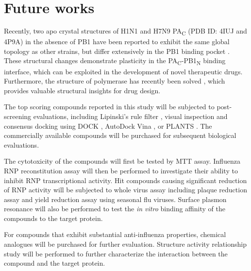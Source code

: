 \section{Future works}

Recently, two apo crystal structures of H1N1 and H7N9 PA\textsubscript{C} (PDB ID: 4IUJ and 4P9A) in the absence of PB1 have been reported to exhibit the same global topology as other strains, but differ extensively in the PB1 binding pocket \citep{1585}. These structural changes demonstrate plasticity in the PA\textsubscript{C}-PB1\textsubscript{N} binding interface, which can be exploited in the development of novel therapeutic drugs. Furthermore, the structure of polymerase has recently been solved \citep{1618,1620}, which provides valuable structural insights for drug design.

The top scoring compounds reported in this study will be subjected to post-screening evaluations, including Lipinski's rule filter \citep{169}, visual inspection and consensus docking \citep{1590} using DOCK \citep{1222}, AutoDock Vina \citep{595}, or PLANTS \citep{610,607,779}. The commercially available compounds will be purchased for subsequent biological evaluations.

The cytotoxicity of the compounds will first be tested by MTT assay. Influenza RNP reconstitution assay will then be performed to investigate their ability to inhibit RNP transcriptional activity. Hit compounds causing significant reduction of RNP activity will be subjected to whole virus assay including plaque reduction assay and yield reduction assay using seasonal flu viruses. Surface plasmon resonance will also be performed to test the \textit{in vitro} binding affinity of the compounds to the target protein. 

For compounds that exhibit substantial anti-influenza properties, chemical analogues will be purchased for further evaluation. Structure activity relationship study will be performed to further characterize the interaction between the compound and the target protein.


\chapterend
